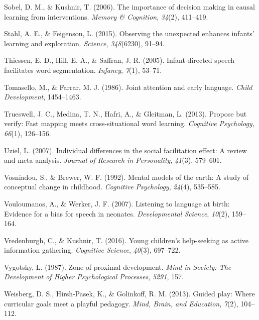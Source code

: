 \documentclass[english,floatsintext,man]{apa6}
\theoremstyle{definition}
\theoremstyle{definition}
\theoremstyle{definition}
\theoremstyle{remark}
\begin{document}
\hypertarget{ref-sobel2006importance}{}
Sobel, D. M., \& Kushnir, T. (2006). The importance of decision making
in causal learning from interventions. \emph{Memory \& Cognition},
\emph{34}(2), 411--419.

\hypertarget{ref-stahl2015observing}{}
Stahl, A. E., \& Feigenson, L. (2015). Observing the unexpected enhances
infants' learning and exploration. \emph{Science}, \emph{348}(6230),
91--94.

\hypertarget{ref-thiessen2005infant}{}
Thiessen, E. D., Hill, E. A., \& Saffran, J. R. (2005). Infant-directed
speech facilitates word segmentation. \emph{Infancy}, \emph{7}(1),
53--71.

\hypertarget{ref-tomasello1986joint}{}
Tomasello, M., \& Farrar, M. J. (1986). Joint attention and early
language. \emph{Child Development}, 1454--1463.

\hypertarget{ref-trueswell2013propose}{}
Trueswell, J. C., Medina, T. N., Hafri, A., \& Gleitman, L. (2013).
Propose but verify: Fast mapping meets cross-situational word learning.
\emph{Cognitive Psychology}, \emph{66}(1), 126--156.

\hypertarget{ref-uziel2007individual}{}
Uziel, L. (2007). Individual differences in the social facilitation
effect: A review and meta-analysis. \emph{Journal of Research in
Personality}, \emph{41}(3), 579--601.

\hypertarget{ref-vosniadou1992mental}{}
Vosniadou, S., \& Brewer, W. F. (1992). Mental models of the earth: A
study of conceptual change in childhood. \emph{Cognitive Psychology},
\emph{24}(4), 535--585.

\hypertarget{ref-vouloumanos2007listening}{}
Vouloumanos, A., \& Werker, J. F. (2007). Listening to language at
birth: Evidence for a bias for speech in neonates. \emph{Developmental
Science}, \emph{10}(2), 159--164.

\hypertarget{ref-vredenburgh2016young}{}
Vredenburgh, C., \& Kushnir, T. (2016). Young children's help-seeking as
active information gathering. \emph{Cognitive Science}, \emph{40}(3),
697--722.

\hypertarget{ref-vygotsky1987zone}{}
Vygotsky, L. (1987). Zone of proximal development. \emph{Mind in
Society: The Development of Higher Psychological Processes},
\emph{5291}, 157.

\hypertarget{ref-weisberg2013guided}{}
Weisberg, D. S., Hirsh-Pasek, K., \& Golinkoff, R. M. (2013). Guided
play: Where curricular goals meet a playful pedagogy. \emph{Mind, Brain,
and Education}, \emph{7}(2), 104--112.
\end{document}
